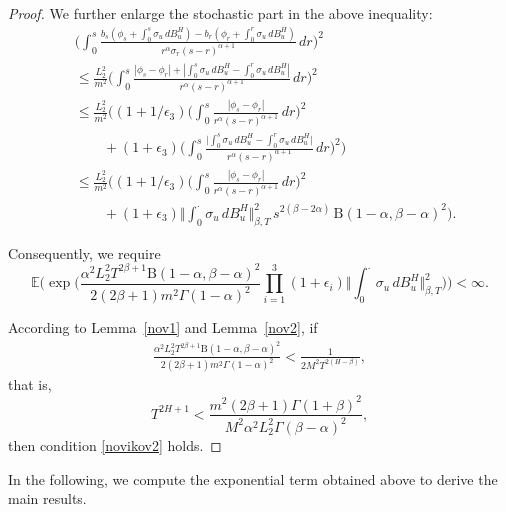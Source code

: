 \documentclass[preprint,12pt]{elsarticle}
\theoremstyle{definition}  %
\theoremstyle{plain}  %
\begin{document}
\begin{proof}
    We further enlarge the stochastic part in the above inequality:
    \begin{align*}
        &\Bigg(\int_0^s \frac{ b_s(\phi_s+\int_0^s \sigma_u \, dB^H_u)-  b_r(\phi_r+\int_0^r \sigma_u \, dB^H_u)}{r^{\alpha} \sigma_r(s-r)^{\alpha+1}} \, dr \Bigg)^2\\ 
        &\leq \frac{L_2^2}{m^2}\Bigg(\int_0^s \frac{|\phi_s-\phi_r|+|\int_0^s \sigma_u \, dB^H_u-\int_0^r \sigma_u \, dB^H_u| }{r^{\alpha} (s-r)^{\alpha+1}} \, dr\Bigg)^2\\
        &\leq \frac{L_2^2}{m^2}\Bigg((1+1/\epsilon_3)\Big(\int_0^s \frac{|\phi_s-\phi_r|}{r^{\alpha} (s-r)^{\alpha+1}} \, dr\Big)^2 \\
        &\qquad+(1+\epsilon_3)\Big(\int_0^s \frac{\big|\int_0^s \sigma_u \, dB^H_u-\int_0^r \sigma_u \, dB^H_u\big| }{r^{\alpha} (s-r)^{\alpha+1}} \, dr\Big)^2  \Bigg)\\
         &\leq \frac{L_2^2}{m^2}\Bigg((1+1/\epsilon_3)\Big(\int_0^s \frac{|\phi_s-\phi_r|}{r^{\alpha} (s-r)^{\alpha+1}} \, dr\Big)^2\\
         &\qquad+(1+\epsilon_3)\Big\Vert \int_0^\cdot \sigma_u \, dB^H_u \Big\Vert_{\beta,T}^2 \, s^{2(\beta-2\alpha)} \, \mathrm{B}(1-\alpha,\beta-\alpha)^2 \Bigg).
    \end{align*}

    Consequently, we require
    \begin{equation}
        \mathbb{E}\Bigg(\exp\!\Bigg(\frac{\alpha^2 L_2^2 T^{2\beta+1} \mathrm{B}(1-\alpha,\beta-\alpha)^2}{2(2\beta+1)m^2\Gamma(1-\alpha)^2} \prod_{i=1}^3(1+\epsilon_i)    \Big\Vert\int_0^\cdot \sigma_u \, dB^H_u \Big\Vert_{\beta,T}^2 \Bigg)\Bigg) <\infty. \label{novikov2}
    \end{equation}

  According to Lemma~\ref{nov1} and Lemma~\ref{nov2}, if 
   \begin{align*}
       \frac{\alpha^2 L_2^2 T^{2\beta+1} \mathrm{B}(1-\alpha,\beta-\alpha)^2}{2(2\beta+1)m^2\Gamma(1-\alpha)^2} <\frac{1}{2M^2 T^{2(H-\beta)}},
   \end{align*}
   that is,
   \begin{equation}
       T^{2H+1} <\frac{m^2(2\beta+1)\Gamma(1+\beta)^2}{M^2\alpha^2L_2^2 \Gamma(\beta-\alpha)^2},
   \end{equation}
   then condition \eqref{novikov2} holds. 
\end{proof}


In the following, we compute the exponential term obtained above to derive the main results.
\end{document}
